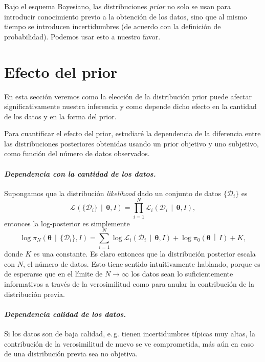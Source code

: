 \documentclass[a4paper,twoside]{article}
\newcommand{\hip}{\ensuremath{\mathbold{\theta}}\xspace}
\newcommand{\dat}{\ensuremath{\{\mathcal{D}_i\}}\xspace}
\newcommand{\pos}[2]{\ensuremath{\pi_N\left(#1\,\middle|\, #2\right)}\xspace}
\newcommand{\pri}[2]{\ensuremath{\pi_0\left(#1\,\middle|\, #2\right)}\xspace}
\newcommand{\lik}[3][]{\ensuremath{\mathcal{L}_{#1}\left(#2\,\middle|\, #3\right)}\xspace}
\begin{document}
Bajo el esquema Bayesiano, las distribuciones \emph{prior} no solo se usan para introducir
conocimiento previo a la obtención de los datos, sino que al mismo tiempo se introducen
incertidumbres (de acuerdo con la definición de probabilidad). Podemos usar esto a nuestro favor.


\section{Efecto del prior}
%
En esta sección veremos como la elección de la distribución prior puede afectar significativamente
nuestra inferencia y como depende dicho efecto en la cantidad de los datos y en la forma del prior.

Para cuantificar el efecto del prior, estudiaré la dependencia de la diferencia entre las
distribuciones posteriores obtenidas usando un prior objetivo y uno subjetivo, como función del
número de datos observados.

\paragraph{\textit{\color{teal}Dependencia con la cantidad de los datos.}} Supongamos que la
distribución \emph{likelihood} dado un conjunto de datos \(\dat\) es
%
\[\lik{\dat}{\hip,I} = \prod_{i=1}^N\lik[i]{\mathcal{D}_i}{\hip,I},\]
%
entonces la log-posterior es simplemente
%
\[\log{\pos{\hip}{\dat,I}} = \sum_{i=1}^N\log{\lik[i]{\mathcal{D}_i}{\hip,I}} + \log{\pri{\hip}{I}} + K,\]
%
donde \(K\) es una constante. Es claro entonces que la distribución posterior escala con \(N\), el
número de datos. Esto tiene sentido intuitivamente hablando, porque es de esperarse que en el límite
de \(N\to\infty\) los datos sean lo suficientemente informativos a través de la verosimilitud como
para anular la contribución de la distribución previa.

\paragraph{\textit{\color{teal}Dependencia calidad de los datos.}} Si los datos son de baja calidad,
e.\,g. tienen incertidumbres típicas muy altas, la contribución de la verosimilitud de nuevo se ve
comprometida, más aún en caso de una distribución previa sea no objetiva.
\end{document}
